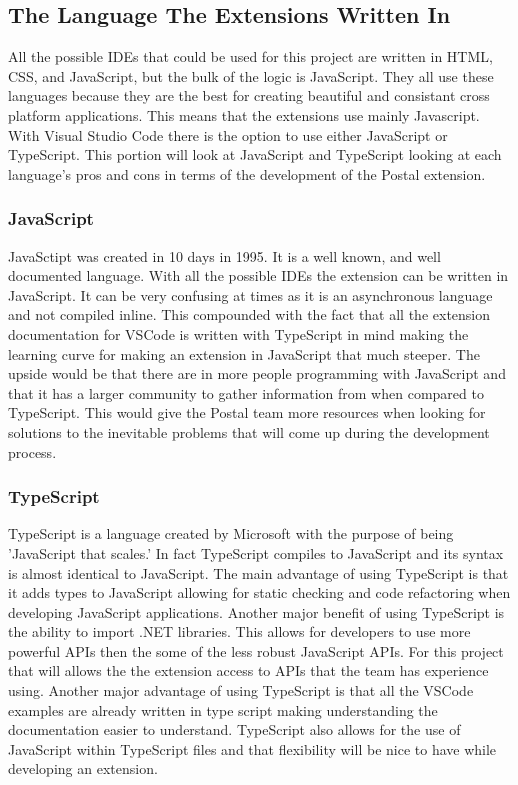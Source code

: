 \documentclass[letterpaper,10pt,titlepage,draftclsnofoot,onecolumn,onesided] {IEEEtran}
\begin{document}
\subsection{The Language The Extensions Written In}
All the possible IDEs that could be used for this project are written in HTML, CSS, and JavaScript, but the bulk of the logic is JavaScript.
They all use these languages because they are the best for creating beautiful and consistant cross platform applications.  
This means that the extensions use mainly Javascript. 
With Visual Studio Code there is the option to use either JavaScript or TypeScript. 
This portion will look at JavaScript and TypeScript looking at each language's pros and cons in terms of the development of the Postal extension.

\subsubsection{JavaScript}
JavaSctipt was created in 10 days in 1995.\cite{JavaScriptHistory}
It is a well known, and well documented language. 
With all the possible IDEs the extension can be written in JavaScript. 
It can be very confusing at times as it is an asynchronous language and not compiled inline.
This compounded with the fact that all the extension documentation for VSCode is written with TypeScript in mind making the learning curve for making an extension in JavaScript that much steeper.
The upside would be that there are in more people programming with JavaScript and that it has a larger community to gather information from when compared to TypeScript. 
This would give the Postal team more resources when looking for solutions to the inevitable problems that will come up during the development process.

\subsubsection{TypeScript}
TypeScript is a language created by Microsoft with the purpose of being 'JavaScript that scales.' \cite{TypeScript}
In fact TypeScript compiles to JavaScript and its syntax is almost identical to JavaScript. 
The main advantage of using TypeScript is that it adds types to JavaScript allowing for static checking and code refactoring when developing JavaScript applications. \cite{TypeScript}
Another major benefit of using TypeScript is the ability to import .NET libraries. 
This allows for developers to use more powerful APIs then the some of the less robust JavaScript APIs. 
For this project that will allows the the extension access to APIs that the team has experience using.
Another major advantage of using TypeScript is that all the VSCode examples are already written in type script making understanding the documentation easier to understand. 
TypeScript also allows for the use of JavaScript within TypeScript files and that flexibility will be nice to have while developing an extension.
\end{document}
